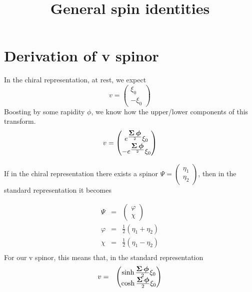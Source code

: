   
\newcommand{\sigdot}[1]{ \gv{\sigma} \hspace{-2pt} \cdot \hspace{-2pt} \v{#1} \,}
\newcommand{\sigdotg}[1]{ \gv{\sigma} \hspace{-2pt} \cdot \hspace{-2pt} \gv{#1} \,}
\newcommand{\dotprod}[2]{ \v{#1} \hspace{-2pt} \cdot \hspace{-2pt} \v{#2} \,}

\newcommand{\beqa}{\begin{eqnarray*} }
\newcommand{\eeqa}{\end{eqnarray*} }

\newcommand{\ubar}{\bar{u}'}
\usepackage{cancel}
\title{General spin identities}

\author{}


\section{Derivation of v spinor}


In the chiral representation, at rest, we expect
\[ v = \begin{pmatrix} \xi_0 \\ -\xi_0 \end{pmatrix} \]
Boosting by some rapidity $\phi$, we know how the upper/lower components of this transform.
\[ v = \begin{pmatrix} e^{ \frac{\mbox{\boldmath$ \Sigma $} \cdot \mbox{\boldmath$ \phi $}}{2} } \xi_0 \\ -e^{ \frac{\mbox{\boldmath$ \Sigma $} \cdot \mbox{\boldmath$ \phi $}}{2} }  \xi_0 \end{pmatrix} \]

If in the chiral representation there exists a spinor $\Psi = \begin{pmatrix} \eta_1 \\ \eta_2 \end{pmatrix}$, then in the standard representation it becomes 

\beqa
	\Psi &=& \begin{pmatrix} \varphi \\ \chi  \end{pmatrix}	\\
	\varphi &=& \frac{1}{2}( \eta_1 + \eta_2 )	\\
	\chi &=& \frac{1}{2} ( \eta_1 - \eta_2)		\\
\eeqa
For our v spinor, this means that, in the standard representation
\beqa
	v &=& \begin{pmatrix} 	\sinh{\frac{\gv{\Sigma} \cdot \gv{\phi}}{2}} \xi_0	\\
		\cosh{\frac{\gv{\Sigma} \cdot \gv{\phi}}{2} } \xi_0	\end{pmatrix}
\eeqa

